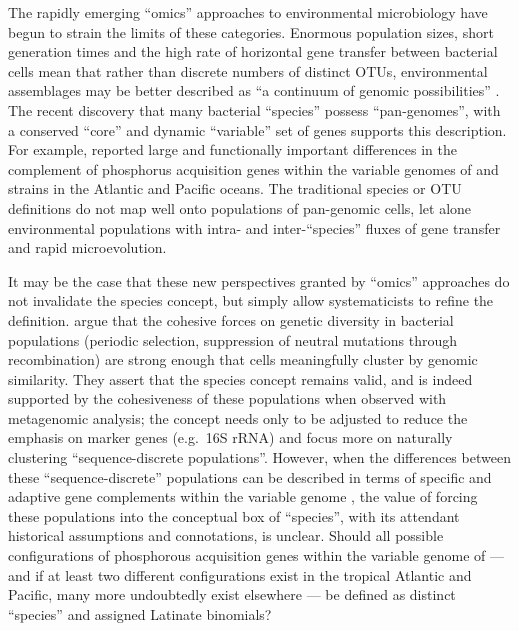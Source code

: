 The rapidly emerging ``omics'' approaches to environmental microbiology have begun to strain the limits of these categories.
Enormous population sizes, short generation times and the high rate of horizontal gene transfer between bacterial cells mean that rather than discrete numbers of distinct \acp{OTU}, environmental assemblages may be better described as ``a continuum of genomic possibilities'' \cite{Goldenfeld:2007im}.
The recent discovery that many bacterial ``species'' possess ``pan-genomes'', with a conserved ``core'' and dynamic ``variable'' set of genes \cite{Tettelin:2005jg} supports this description.
For example, \citet{Coleman:2010jj} reported large and functionally important differences in the complement of phosphorus acquisition genes within the variable genomes of  and  strains in the Atlantic and Pacific oceans.
The traditional species or \ac{OTU} definitions do not map well onto populations of pan-genomic cells, let alone environmental populations with intra- and inter-``species'' fluxes of gene transfer and rapid microevolution.

It may be the case that these new perspectives granted by ``omics'' approaches do not invalidate the species concept, but simply allow systematicists to refine the definition.
\citet{CaroQuintero:2011jv} argue that the cohesive forces on genetic diversity in bacterial populations (periodic selection, suppression of neutral mutations through recombination) are strong enough that cells meaningfully cluster by genomic similarity.
They assert that the species concept remains valid, and is indeed supported by the cohesiveness of these populations when observed with metagenomic analysis; the concept needs only to be adjusted to reduce the emphasis on marker genes (e.g.\ 16S rRNA) and focus more on naturally clustering ``sequence-discrete populations''.
However, when the differences between these ``sequence-discrete'' populations can be described in terms of specific and adaptive gene complements within the variable genome \citep[as in][]{Coleman:2010jj}, the value of forcing these populations into the conceptual box of ``species'', with its attendant historical assumptions and connotations, is unclear.
Should all possible configurations of phosphorous acquisition genes within the variable genome of  --- and if at least two different configurations exist in the tropical Atlantic and Pacific, many more undoubtedly exist elsewhere --- be defined as distinct ``species'' and assigned Latinate binomials?

